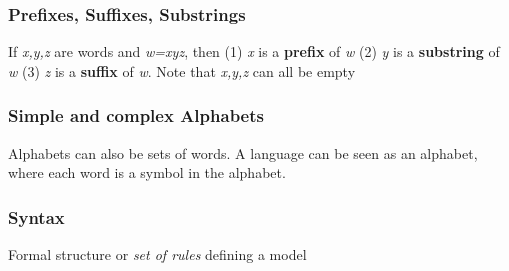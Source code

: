 \documentclass[a3paper, 8pt]{extarticle}
\begin{document}
\begin{multicols*}{6}
        
\subsubsection{Prefixes, Suffixes, Substrings} If \textit{x,y,z} are words and \textit{w=xyz}, then (1) \textit{x} is a \textbf{prefix} of \textit{w}
        (2) \textit{y} is a \textbf{substring} of \textit{w}
        (3) \textit{z} is a \textbf{suffix} of \textit{w}. Note that \textit{x,y,z} can all be empty
        
        
        \subsubsection{Simple and complex Alphabets}
        Alphabets can also be sets of words. A language can be seen as an alphabet, where each word is a symbol in the alphabet.
        

    
    \subsubsection{Syntax} 
    Formal structure or \textit{set of rules} defining a model
    

\end{multicols*}
\end{document}
